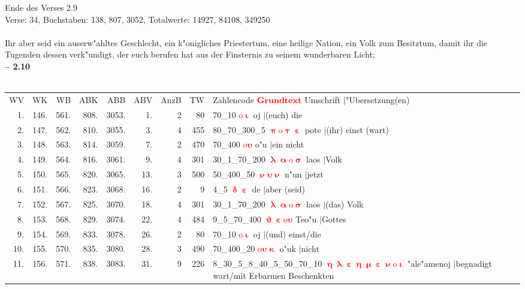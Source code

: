 \documentclass[a4paper,10pt,landscape]{article}
\begin{document}
Ende des Verses 2.9\\
Verse: 34, Buchstaben: 138, 807, 3052, Totalwerte: 14927, 84108, 349250\\
\\
Ihr aber seid ein auserw"ahltes Geschlecht, ein k"onigliches Priestertum, eine heilige Nation, ein Volk zum Besitztum, damit ihr die Tugenden dessen verk"undigt, der euch berufen hat aus der Finsternis zu seinem wunderbaren Licht;\\
\newpage 
{\bf -- 2.10}\\
\medskip \\
\begin{tabular}{rrrrrrrrp{120mm}}
WV&WK&WB&ABK&ABB&ABV&AnzB&TW&Zahlencode \textcolor{red}{$\boldsymbol{Grundtext}$} Umschrift $|$"Ubersetzung(en)\\
1.&146.&561.&808.&3053.&1.&2&80&70\_10 \textcolor{red}{$\boldsymbol{\mathrm{o}\upiota}$} oj $|$(euch) die\\
2.&147.&562.&810.&3055.&3.&4&455&80\_70\_300\_5 \textcolor{red}{$\boldsymbol{\uppi\mathrm{o}\uptau\upepsilon}$} pote $|$(ihr) einst (wart)\\
3.&148.&563.&814.&3059.&7.&2&470&70\_400 \textcolor{red}{$\boldsymbol{\mathrm{o}\upsilon}$} o"u $|$ein nicht\\
4.&149.&564.&816.&3061.&9.&4&301&30\_1\_70\_200 \textcolor{red}{$\boldsymbol{\uplambda\upalpha\mathrm{o}\upsigma}$} laos $|$Volk\\
5.&150.&565.&820.&3065.&13.&3&500&50\_400\_50 \textcolor{red}{$\boldsymbol{\upnu\upsilon\upnu}$} n"un $|$jetzt\\
6.&151.&566.&823.&3068.&16.&2&9&4\_5 \textcolor{red}{$\boldsymbol{\updelta\upepsilon}$} de $|$aber (seid)\\
7.&152.&567.&825.&3070.&18.&4&301&30\_1\_70\_200 \textcolor{red}{$\boldsymbol{\uplambda\upalpha\mathrm{o}\upsigma}$} laos $|$(das) Volk\\
8.&153.&568.&829.&3074.&22.&4&484&9\_5\_70\_400 \textcolor{red}{$\boldsymbol{\upvartheta\upepsilon\mathrm{o}\upsilon}$} Teo"u $|$Gottes\\
9.&154.&569.&833.&3078.&26.&2&80&70\_10 \textcolor{red}{$\boldsymbol{\mathrm{o}\upiota}$} oj $|$(und) einst/die\\
10.&155.&570.&835.&3080.&28.&3&490&70\_400\_20 \textcolor{red}{$\boldsymbol{\mathrm{o}\upsilon\upkappa}$} o"uk $|$nicht\\
11.&156.&571.&838.&3083.&31.&9&226&8\_30\_5\_8\_40\_5\_50\_70\_10 \textcolor{red}{$\boldsymbol{\upeta\uplambda\upepsilon\upeta\upmu\upepsilon\upnu\mathrm{o}\upiota}$} "ale"amenoj $|$begnadigt wart/mit Erbarmen Beschenkten\\

\end{tabular}
\end{document}

